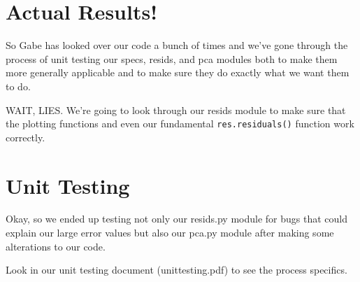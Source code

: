 \documentclass{article} \usepackage{amsmath}
\begin{document}
\section{Actual Results!}
\label{forrealz}

So Gabe has looked over our code a bunch of times and we've gone
through the process of unit testing our specs, resids, and pca modules
both to make them more generally applicable and to make sure they do
exactly what we want them to do.

WAIT, LIES.  We're going to look through our resids module to make
sure that the plotting functions and even our fundamental
\verb|res.residuals()| function work correctly.

\section{Unit Testing}
\label{sec:testing}

Okay, so we ended up testing not only our resids.py module for bugs
that could explain our large error values but also our pca.py module
after making some alterations to our code.

Look in our unit testing document (unittesting.pdf) to see the process
specifics.
\end{document}
